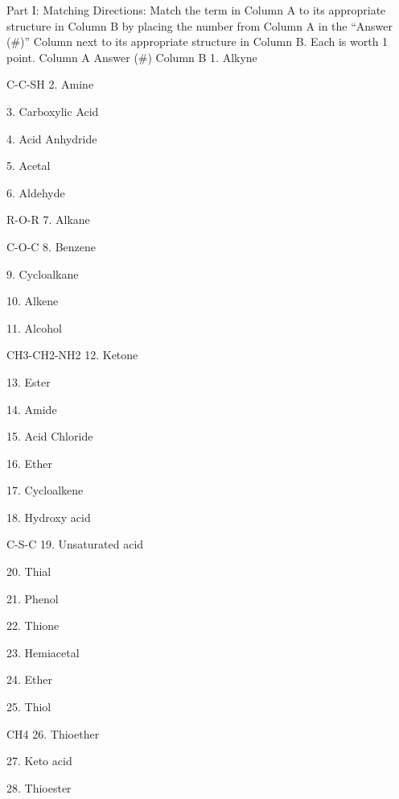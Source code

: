 \documentclass[addpoints, 12pt]{exam}
\begin{document}
\begin{questions}



Part I:  Matching 
Directions: Match the term in Column A to its appropriate structure in Column B by placing the number from Column A in the “Answer (#)” Column next to its appropriate structure in Column B.  Each is worth 1 point.
Column A
Answer (#)
Column B
1.  Alkyne

C-C-SH 
2.  Amine


3.  Carboxylic Acid


4.  Acid Anhydride


5.  Acetal


6.  Aldehyde

R-O-R
7.  Alkane

C-O-C
8. Benzene


9. Cycloalkane


10. Alkene


11. Alcohol

CH3-CH2-NH2
12. Ketone


13. Ester


14. Amide


15. Acid Chloride


16. Ether


17. Cycloalkene


18. Hydroxy acid

C-S-C 
19. Unsaturated acid


20. Thial


21. Phenol


22. Thione


23. Hemiacetal


24. Ether


25. Thiol

CH4
26. Thioether


27. Keto acid


28. Thioester







\end{questions}
\end{document}

